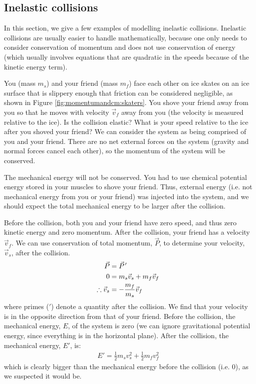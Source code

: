 \subsection{Inelastic collisions}
In this section, we give a few examples of modelling inelastic collisions. Inelastic collisions are usually easier to handle mathematically, because one only needs to consider conservation of momentum and does not use conservation of energy (which usually involves equations that are quadratic in the speeds because of the kinetic energy term). 
\begin{example}{
You (mass $m_s$) and your friend (mass $m_f$) face each other on ice skates on an ice surface that is slippery enough that friction can be considered negligible, as shown in Figure \ref{fig:momentumandcm:skaters}. You shove your friend away from you so that he moves with velocity $\vec v_f$ away from you (the velocity is measured relative to the ice). Is the collision elastic? What is your speed relative to the ice after you shoved your friend?}
We can consider the system as being comprised of you and your friend. There are no net external forces on the system (gravity and normal forces cancel each other), so the momentum of the system will be conserved. 

The mechanical energy will not be conserved. You had to use chemical potential energy stored in your muscles to shove your friend. Thus, external energy (i.e. not mechanical energy from you or your friend) was injected into the system, and we should expect the total mechanical energy to be larger after the collision. 

Before the collision, both you and your friend have zero speed, and thus zero kinetic energy and zero momentum. After the collision, your friend has a velocity $\vec v_f$. We can use conservation of total momentum, $\vec P$, to determine your velocity, $\vec v_s$, after the collision. 
\begin{align*}
\vec P &=\pvec P'\\
0 &= m_s\vec v_s + m_f\vec v_f\\
\therefore \vec v_s &= -\frac{m_f}{m_s}\vec v_f
\end{align*}
where primes ($'$) denote a quantity after the collision. We find that your velocity is in the opposite direction from that of your friend. Before the collision, the mechanical energy, $E$, of the system is zero (we can ignore gravitational potential energy, since everything is in the horizontal plane). After the collision, the mechanical energy, $E'$, is:
\begin{align*}
E' = \frac{1}{2}m_sv_s^2+\frac{1}{2}m_fv_f^2
\end{align*}
which is clearly bigger than the mechanical energy before the collision (i.e. 0), as we suspected it would be.


\end{example}
